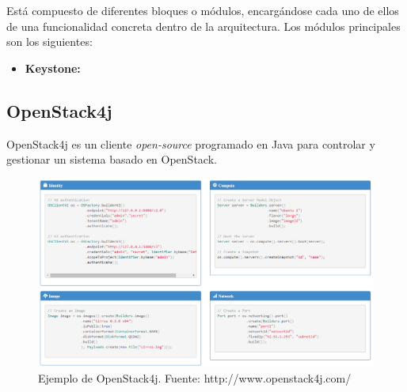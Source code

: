 Está compuesto de diferentes bloques o módulos, encargándose cada uno de ellos de una funcionalidad concreta dentro de la arquitectura. Los módulos principales son los siguientes:

\begin{itemize}
	\item \textbf{Keystone:} 
\end{itemize}

\subsection{OpenStack4j}
\label{subsec:openstack4j}

OpenStack4j es un cliente \textit{open-source} programado en Java para controlar y gestionar un sistema basado en OpenStack.

\begin{figure}[!ht]
	\centering
	\includegraphics[width=1\linewidth]{imagenes/ejemplo_os4j}
	\caption{Ejemplo de OpenStack4j. Fuente: http://www.openstack4j.com/}
	\label{fig:ejemploos4j}
\end{figure}

